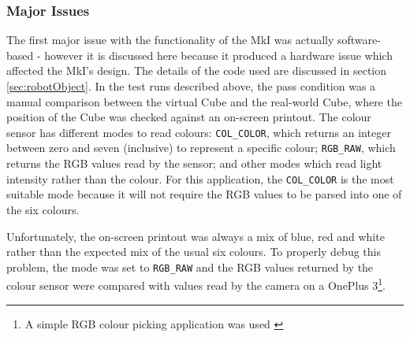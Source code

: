 \documentclass{report}
\begin{document}
	\subsubsection{Major Issues} \label{sec:mkIMajorIssues}
	
	The first major issue with the functionality of the MkI was actually software-based - however it is discussed here because it produced a hardware issue which affected the MkI's design. The details of the code used are discussed in section \ref{sec:robotObject}. In the test runs described above, the pass condition was a manual comparison between the virtual Cube and the real-world Cube, where the position of the Cube was checked against an on-screen printout. The colour sensor has different modes to read colours: \lstinline|COL_COLOR|, which returns an integer between zero and seven (inclusive) to represent a specific colour; \lstinline|RGB_RAW|, which returns the RGB values read by the sensor; and other modes which read light intensity rather than the colour. For this application, the \lstinline|COL_COLOR| is the most suitable mode because it will not require the RGB values to be parsed into one of the six colours.
	
	Unfortunately, the on-screen printout was always a mix of blue, red and white rather than the expected mix of the usual six colours. To properly debug this problem, the mode was set to \lstinline|RGB_RAW| and the RGB values returned by the colour sensor were compared with values read by the camera on a OnePlus 3\footnote{A simple RGB colour picking application was used \cite{RangoApps2015}}.
	
\end{document}
